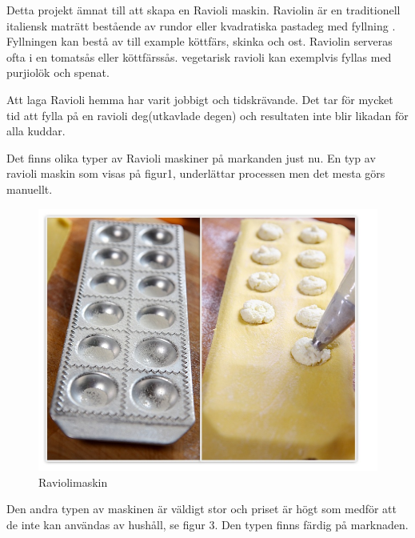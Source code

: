 Detta projekt ämnat till att skapa en Ravioli maskin. Raviolin är en traditionell italiensk maträtt bestående av rundor eller kvadratiska pastadeg med fyllning \cite{engproc}. Fyllningen kan bestå av till example köttfärs, skinka och ost. Raviolin serveras ofta i en tomatsås eller köttfärssås. vegetarisk ravioli kan exemplvis fyllas med purjiolök och spenat.\medskip

Att laga Ravioli hemma har varit jobbigt och tidskrävande. Det tar för mycket tid att fylla på en ravioli deg(utkavlade degen) och resultaten inte blir likadan för alla kuddar.\medskip

Det finns olika typer av Ravioli maskiner på markanden just nu. En typ av ravioli maskin som visas på figur1, underlättar processen men det mesta görs manuellt.\medskip

	\begin{figure}[h]
		\begin{center}
			\includegraphics[scale=0.5]{images/raviolimoldwithfilling.jpg}
			\caption{Raviolimaskin}
			\label{ravioli}	
		\end{center}
	\end{figure}
Den andra typen av maskinen är väldigt stor och priset är högt som medför att de inte kan användas av hushåll, se figur 3. Den typen finns färdig på marknaden.
